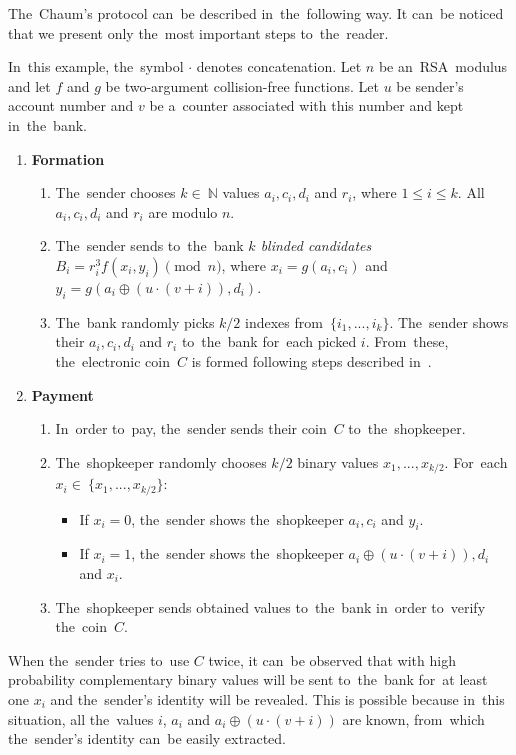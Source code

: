 The~Chaum's protocol can~be described in~the~following way. It can~be noticed that we present only the~most important steps to~the~reader.

In~this example, the~symbol $\cdot$ denotes concatenation. Let $n$ be an~RSA~modulus and let $f$ and $g$ be two-argument collision-free functions. Let $u$ be sender's account number and $v$ be a~counter associated with this number and kept in~the~bank.

\begin{enumerate}
\item{\textbf{Formation}
\smallbreak
\begin{enumerate}
\item The~sender chooses $k \in~\mathbb{N}$ values $a_i, c_i, d_i$ and $r_i$, where $1 \le i \le k$. All $a_i, c_i, d_i$ and $r_i$ are modulo $n$.
\item The~sender sends to~the~bank \emph{$k$ blinded candidates} $B_i = r_i^3f(x_i,y_i)\pmod n$, where $x_i = g(a_i,c_i)$ and $y_i = g(a_i \oplus (u\cdot (v+i)), d_i)$.
\item The~bank randomly picks $k/2$ indexes from~$\{i_1,...,i_k\}$.
The~sender shows their $a_i, c_i, d_i$ and $r_i$ to~the~bank for~each picked $i$. From~these, the~electronic coin~$C$ is formed following steps described in~\cite{Chaum}.
\end{enumerate}}
\item{\textbf{Payment}
\smallbreak
\begin{enumerate}
\item In~order to~pay, the~sender sends their coin~$C$ to~the~shopkeeper.
\item{The~shopkeeper randomly chooses $k/2$ binary values $x_1, ..., x_{k/2}$. For~each $x_i \in~\{x_1, ..., x_{k/2}\}$:
\begin{itemize}
\item If $x_i = 0$, the~sender shows the~shopkeeper $a_i, c_i$ and $y_i$.
\item If $x_i = 1$, the~sender shows the~shopkeeper $a_i \oplus (u\cdot (v+i)), d_i$ and $x_i$.
\end{itemize}}
\item The~shopkeeper sends obtained values to~the~bank in~order to~verify the~coin~$C$.
\end{enumerate}
}
\end{enumerate}

When the~sender tries to~use $C$ twice, it can~be observed that with high probability complementary binary values will be sent to~the~bank for~at least one $x_i$ and the~sender's identity will be revealed. This is possible because in~this situation, all the~values $i$, $a_i$ and $a_i \oplus (u\cdot (v+i))$ are known, from~which the~sender's identity can~be easily extracted. 

